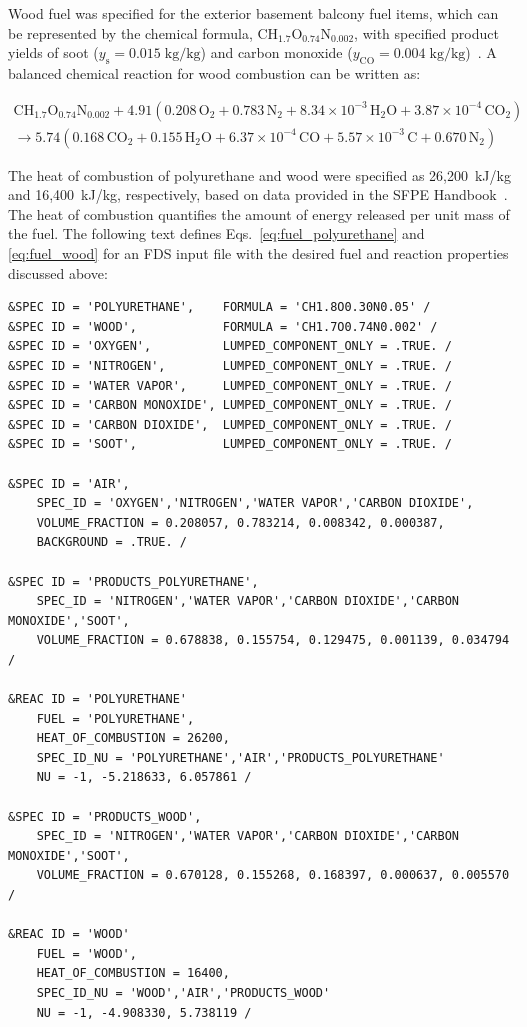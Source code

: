 \documentclass[12pt,oneside]{book}
\renewcommand{\C}{\mbox{C}}
\renewcommand{\H}{\mbox{H}}
\renewcommand{\O}{\mbox{O}}
\newcommand{\N}{\mbox{N}}
\begin{document}
Wood fuel was specified for the exterior basement balcony fuel items, which can be represented by the chemical formula, $\C\H_{1.7}\O_{0.74}\N_{0.002}$, with specified product yields of soot ($y_{\mathrm{s}}=0.015 \; \mathrm{kg}/\mathrm{kg}$) and carbon monoxide ($y_{\mathrm{CO}}=0.004 \; \mathrm{kg}/\mathrm{kg}$)~\cite{SFPE:Tewarson}. A balanced chemical reaction for wood combustion can be written as:

\begin{multline}
\C\H_{1.7}\O_{0.74}\N_{0.002} + 4.91(0.208\,\O_{2} + 0.783\,\N_{2} + 8.34 \times 10^{-3}\,\H_{2}\O + 3.87 \times 10^{-4}\,\C\O_{2}) \\
\rightarrow 5.74(0.168\,\C\O_{2} + 0.155\,\H_{2}\O + 6.37 \times 10^{-4}\,\C\O + 5.57 \times 10^{-3}\,\C + 0.670\,\N_{2})
\label{eq:fuel_wood}
\end{multline}

The heat of combustion of polyurethane and wood were specified as 26,200~kJ/kg and 16,400~kJ/kg, respectively, based on data provided in the SFPE Handbook~\cite{SFPE:Tewarson}. The heat of combustion quantifies the amount of energy released per unit mass of the fuel. The following text defines Eqs.~\ref{eq:fuel_polyurethane} and \ref{eq:fuel_wood} for an FDS input file with the desired fuel and reaction properties discussed above:

\begin{lstlisting}[basicstyle=\ttfamily\scriptsize]
&SPEC ID = 'POLYURETHANE',    FORMULA = 'CH1.8O0.30N0.05' /
&SPEC ID = 'WOOD',            FORMULA = 'CH1.7O0.74N0.002' /
&SPEC ID = 'OXYGEN',          LUMPED_COMPONENT_ONLY = .TRUE. /
&SPEC ID = 'NITROGEN',        LUMPED_COMPONENT_ONLY = .TRUE. /
&SPEC ID = 'WATER VAPOR',     LUMPED_COMPONENT_ONLY = .TRUE. /
&SPEC ID = 'CARBON MONOXIDE', LUMPED_COMPONENT_ONLY = .TRUE. /
&SPEC ID = 'CARBON DIOXIDE',  LUMPED_COMPONENT_ONLY = .TRUE. /
&SPEC ID = 'SOOT',            LUMPED_COMPONENT_ONLY = .TRUE. /

&SPEC ID = 'AIR',
    SPEC_ID = 'OXYGEN','NITROGEN','WATER VAPOR','CARBON DIOXIDE',
    VOLUME_FRACTION = 0.208057, 0.783214, 0.008342, 0.000387,
    BACKGROUND = .TRUE. /

&SPEC ID = 'PRODUCTS_POLYURETHANE',
    SPEC_ID = 'NITROGEN','WATER VAPOR','CARBON DIOXIDE','CARBON MONOXIDE','SOOT',
    VOLUME_FRACTION = 0.678838, 0.155754, 0.129475, 0.001139, 0.034794 /

&REAC ID = 'POLYURETHANE'
    FUEL = 'POLYURETHANE',
    HEAT_OF_COMBUSTION = 26200,
    SPEC_ID_NU = 'POLYURETHANE','AIR','PRODUCTS_POLYURETHANE'
    NU = -1, -5.218633, 6.057861 /

&SPEC ID = 'PRODUCTS_WOOD',
    SPEC_ID = 'NITROGEN','WATER VAPOR','CARBON DIOXIDE','CARBON MONOXIDE','SOOT',
    VOLUME_FRACTION = 0.670128, 0.155268, 0.168397, 0.000637, 0.005570 /

&REAC ID = 'WOOD'
    FUEL = 'WOOD',
    HEAT_OF_COMBUSTION = 16400,
    SPEC_ID_NU = 'WOOD','AIR','PRODUCTS_WOOD'
    NU = -1, -4.908330, 5.738119 /
\end{lstlisting}
\end{document}
